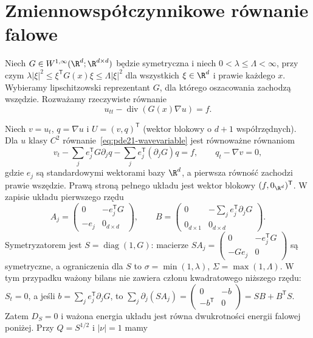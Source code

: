 \section{Zmiennowspółczynnikowe równanie falowe}
Niech $G\in W^{1,\infty}(\R^d;\R^{d\times d})$
będzie symetryczna i niech $0<\lambda\le\Lambda<\infty$,
przy czym
$\lambda|\xi|^2\le\xi^\mathsf TG(x)\xi\le\Lambda|\xi|^2$
dla wszystkich $\xi\in\R^d$ i prawie każdego $x$.
Wybieramy lipschitzowski reprezentant $G$,
dla którego oszacowania zachodzą wszędzie.
Rozważamy rzeczywiste równanie
\begin{equation}\label{eq:pde21-wavevariable}
 u_{tt}-\operatorname{div}(G(x)\nabla u)=f.
\end{equation}

\begin{uwaga}
Niech $v=u_t$, $q=\nabla u$ i $U=(v,q)^\mathsf T$
(wektor blokowy o $d+1$ współrzędnych).
Dla $u$ klasy $C^2$ równanie~\eqref{eq:pde21-wavevariable}
jest równoważne równaniom
\[
 v_t-\sum_j e_j^\mathsf TG\partial_j q
       -\sum_j e_j^\mathsf T(\partial_jG)q=f,
 \qquad q_t-\nabla v=0,
\]
gdzie $e_j$ są standardowymi wektorami bazy $\R^d$,
a pierwsza równość zachodzi prawie wszędzie.
Prawą stroną pełnego układu jest wektor blokowy
$(f,0_{\R^d})^\mathsf T$.
W zapisie układu pierwszego rzędu
\[
 A_j=\begin{pmatrix}0&-e_j^\mathsf TG\\-e_j&0_{d\times d}\end{pmatrix},
 \qquad
 B=\begin{pmatrix}0&-\sum_j e_j^\mathsf T\partial_jG\\
                   0_{d\times1}&0_{d\times d}\end{pmatrix}.
\]
Symetryzatorem jest $S=\operatorname{diag}(1,G)$:
macierze
$SA_j=\begin{pmatrix}0&-e_j^\mathsf TG\\-Ge_j&0\end{pmatrix}$
są symetryczne, a ograniczenia dla $S$ to
$\sigma=\min(1,\lambda)$, $\Sigma=\max(1,\Lambda)$.
W tym przypadku ważony bilans nie zawiera członu
kwadratowego niższego rzędu: $S_t=0$, a jeśli
$b=\sum_j e_j^\mathsf T\partial_jG$, to
$\sum_j\partial_j(SA_j)=
\begin{pmatrix}0&-b\\-b^\mathsf T&0\end{pmatrix}
=SB+B^\mathsf TS$.
Zatem $D_S=0$ i ważona energia układu jest
równa dwukrotności energii falowej poniżej.
Przy $Q=S^{1/2}$ i $|\nu|=1$ mamy

\end{uwaga}
